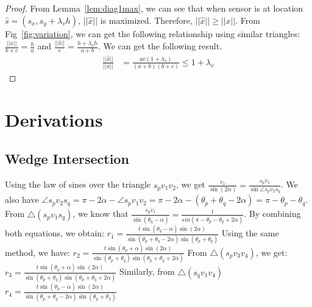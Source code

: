 \begin{proof}
From Lemma~\ref{lem:diag1max}, we can see that when sensor is at location $\hat{s} = (s_x ,s_y+ \lambda_vh)$, $||\hat{x}||$ is maximized. Therefore, $||\hat{x}|| \geq ||x||$. From Fig~\ref{fig:variation}, we can get the following relationship using similar triangles:
$\frac{||x||}{b+c} = \frac{h}{a}$ and 
$\frac{||\hat{x}||}{c} = \frac{h + \lambda_vh}{a+b}$. 
We can get the following result.
\begin{align*}
\frac{||\hat{x}||}{||x||} &= \frac{ac(1+\lambda_v)}{(a+b)(b+c)}  \leq 1+\lambda_v
\end{align*}
\end{proof}

\section{Derivations}
\subsection{Wedge Intersection}
\label{sec:wedgeIntersection}
Using the law of sines over the triangle $s_pv_1v_2$, we get $\frac{r_1}{\sin(2\alpha)} = \frac{\overline{s_pv_1}}{\sin{\angle{s_pv_2s_q}}}$. We also have  $\angle{s_pv_2s_q} = \pi - 2\alpha-\angle{s_pv_1v_2} = \pi - 2\alpha - (\theta_p + \theta_q - 2\alpha) = \pi-\theta_p - \theta_q$. From  
$\triangle(s_pv_1s_q)$, we know that $\frac{\overline{s_pv_1}}{\sin(\theta_q-\alpha)} = \frac{t}{sin(\pi-\theta_p-\theta_q+2\alpha)}$. By combining both equations, we obtain:
$
r_1 = \frac{t\sin(\theta_q-\alpha)\sin(2\alpha)}{\sin(\theta_p+\theta_q-2\alpha)\sin(\theta_p+\theta_q)}
$
Using the same method, we have:
$
r_2 = \frac{t\sin(\theta_p+\alpha)\sin(2\alpha)}{\sin(\theta_p+\theta_q)\sin(\theta_p+\theta_q+2\alpha)}
$
From $\triangle(s_pv_3v_4)$, we get:
$
r_3 = \frac{t\sin(\theta_q+\alpha)\sin(2\alpha)}{\sin(\theta_p+\theta_q)\sin(\theta_p+\theta_q+2\alpha)}
$
Similarly, from $\triangle(s_qv_1v_4)$
$
r_4 =\frac{t\sin(\theta_p-\alpha)\sin(2\alpha)}{\sin(\theta_p+\theta_q-2\alpha)\sin(\theta_p+\theta_2)}
$


